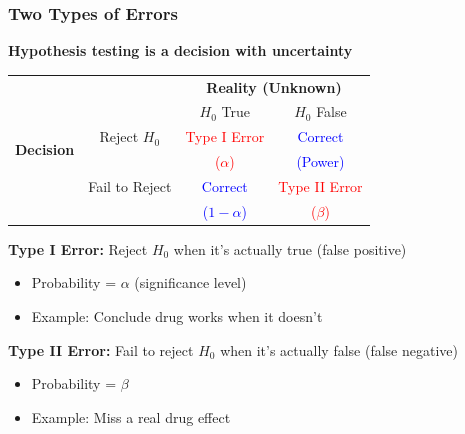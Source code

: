 \documentclass{beamer}
\begin{document}
\begin{frame}
\frametitle{Two Types of Errors}
\textbf{Hypothesis testing is a decision with uncertainty}

\vspace{0.5cm}
\begin{center}
\begin{tabular}{cc|cc}
\toprule
& & \multicolumn{2}{c}{\textbf{Reality (Unknown)}} \\
& & $H_0$ True & $H_0$ False \\
\midrule
\multirow{2}{*}{\textbf{Decision}} & Reject $H_0$ & \textcolor{red}{Type I Error} & \textcolor{blue}{Correct} \\
& & \textcolor{red}{($\alpha$)} & \textcolor{blue}{(Power)} \\
& Fail to Reject & \textcolor{blue}{Correct} & \textcolor{red}{Type II Error} \\
& & \textcolor{blue}{($1-\alpha$)} & \textcolor{red}{($\beta$)} \\
\bottomrule
\end{tabular}
\end{center}

\vspace{0.3cm}
\textbf{Type I Error:} Reject $H_0$ when it's actually true (false positive)
\begin{itemize}
\item Probability = $\alpha$ (significance level)
\item Example: Conclude drug works when it doesn't
\end{itemize}

\vspace{0.1cm}
\textbf{Type II Error:} Fail to reject $H_0$ when it's actually false (false negative)
\begin{itemize}
\item Probability = $\beta$
\item Example: Miss a real drug effect
\end{itemize}
\end{frame}
\end{document}

